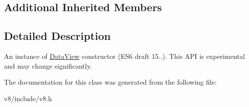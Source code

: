 \subsection*{Additional Inherited Members}


\subsection{Detailed Description}
An instance of \hyperlink{classv8_1_1DataView}{Data\+View} constructor (E\+S6 draft 15..). This A\+P\+I is experimental and may change significantly. 

The documentation for this class was generated from the following file\+:\begin{DoxyCompactItemize}
\item 
v8/include/v8.\+h\end{DoxyCompactItemize}
